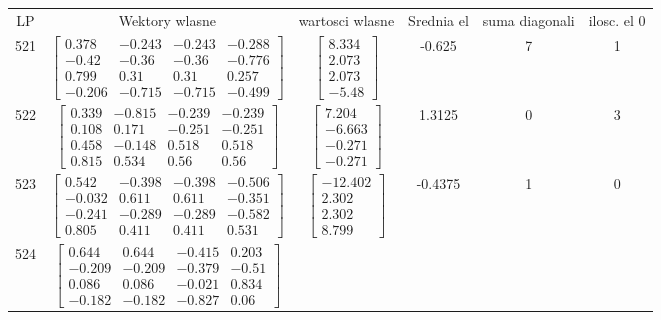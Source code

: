 \documentclass[a4paper,12pt]{article}
\begin{document}
\bgroup {} \vspace{0.2in} \begin{tabular}{c c c c c c}
LP &Wektory wlasne & wartosci wlasne & Srednia el & suma diagonali & ilosc. el 0\\
521
&
$\begin{bmatrix} 0.378 & -0.243 & -0.243 & -0.288 \\ -0.42 & -0.36 & -0.36 & -0.776 \\ 0.799 & 0.31 & 0.31 & 0.257 \\ -0.206 & -0.715 & -0.715 & -0.499 \end{bmatrix}$
&
$\begin{bmatrix} 8.334 \\ 2.073 \\ 2.073 \\ -5.48 \end{bmatrix}$
&
-0.625
&
7
&
1
\\
522
&
$\begin{bmatrix} 0.339 & -0.815 & -0.239 & -0.239 \\ 0.108 & 0.171 & -0.251 & -0.251 \\ 0.458 & -0.148 & 0.518 & 0.518 \\ 0.815 & 0.534 & 0.56 & 0.56 \end{bmatrix}$
&
$\begin{bmatrix} 7.204 \\ -6.663 \\ -0.271 \\ -0.271 \end{bmatrix}$
&
1.3125
&
0
&
3
\\
523
&
$\begin{bmatrix} 0.542 & -0.398 & -0.398 & -0.506 \\ -0.032 & 0.611 & 0.611 & -0.351 \\ -0.241 & -0.289 & -0.289 & -0.582 \\ 0.805 & 0.411 & 0.411 & 0.531 \end{bmatrix}$
&
$\begin{bmatrix} -12.402 \\ 2.302 \\ 2.302 \\ 8.799 \end{bmatrix}$
&
-0.4375
&
1
&
0
\\
524
&
$\begin{bmatrix} 0.644 & 0.644 & -0.415 & 0.203 \\ -0.209 & -0.209 & -0.379 & -0.51 \\ 0.086 & 0.086 & -0.021 & 0.834 \\ -0.182 & -0.182 & -0.827 & 0.06 \end{bmatrix}$

\end{tabular}
\end{document}
